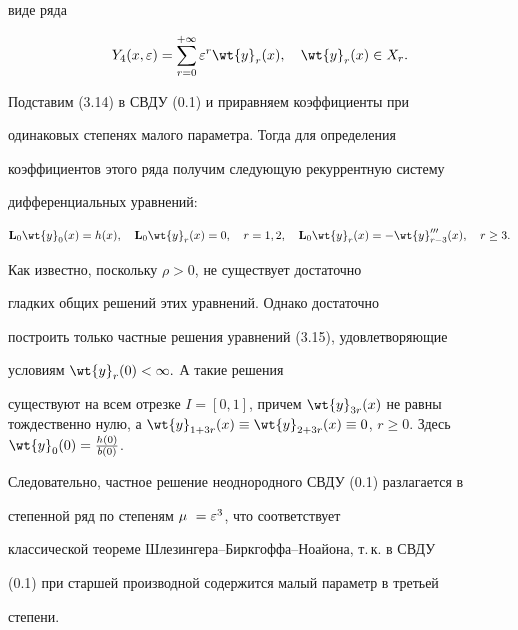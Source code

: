виде ряда


\begin{equation}


Y_4 (x, \e) = \sum _{r=0}^{+\infty} \e^r \wt{y}_r (x),


\quad \wt{y}_r (x)\in X_r.


\end{equation}


Подставим (3.14) в СВДУ (0.1) и приравняем коэффициенты при


одинаковых степенях малого параметра. Тогда для определения


коэффициентов этого ряда получим следующую рекуррентную систему


дифференциальных уравнений:


\begin{equation}


\bold{L}_0 \wt{y}_{0} (x) = h (x), \quad \bold{L}_0 \wt{y}_{r} (x) = 0,


\quad r = 1,2, \quad \bold{L}_0 \wt{y}_{r} (x) = - \wt{y}_{r-3} ''' (x),


\quad r\geq 3.


\end{equation}


Как известно, поскольку $\rho > 0$, не существует достаточно


гладких общих решений этих уравнений. Однако достаточно


построить только частные решения уравнений (3.15), удовлетворяющие


условиям $\wt{y}_{r} (0) < \infty.$ А такие решения


существуют на всем отрезке $I = [0,1]$, причем $ \wt{y}_{3r}


(x) $ не равны тождественно нулю, а $ \wt{y}_{1 +3r} (x) \equiv


\wt{y}_{2 + 3r} (x)\equiv 0 $, $r\geq 0$. Здесь $ \wt{y}_{0}


(0) = \frac{h (0)}{b (0)}$.


Следовательно, частное решение неоднородного СВДУ (0.1) разлагается в


степенной ряд по степеням $\mu\ = \varepsilon^3$, что соответствует


классической теореме Шлезингера--Биркгоффа--Ноайона, т.\,к. в СВДУ


(0.1) при старшей производной содержится малый параметр в третьей


степени.








